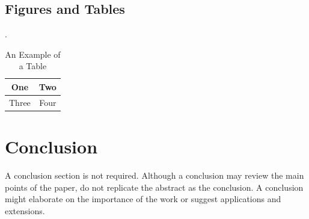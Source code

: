 \documentclass[letterpaper, 10 pt, conference]{ieeeconf} %
\begin{document}
\subsection{Figures and Tables}
 \cite{IEEEexample:shellCTANpage} \cite{IEEEexample:IEEEwebsite}.

\begin{table}[h]
\caption{An Example of a Table}
\label{table_example}
\begin{center}
\begin{tabular}{|c||c|}
\hline
One & Two\\
\hline
Three & Four\\
\hline
\end{tabular}
\end{center}
\end{table}

\section{Conclusion}

A conclusion section is not required. Although a conclusion may review the main points of the paper, do not replicate the abstract as the conclusion. A conclusion might elaborate on the importance of the work or suggest applications and extensions.





\end{document}
